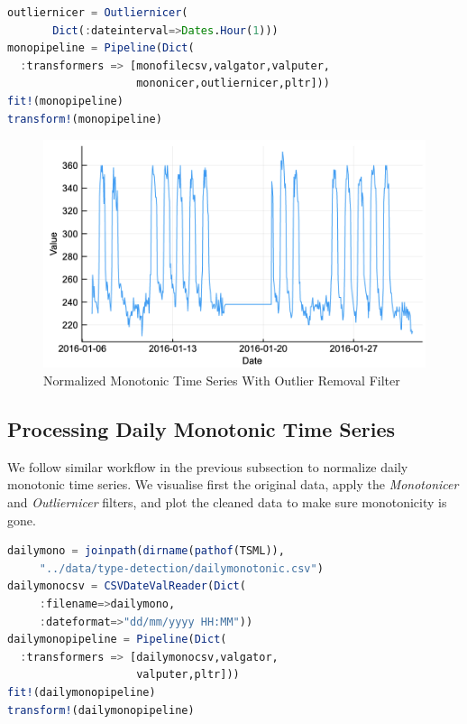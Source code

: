 \documentclass{juliacon}
\begin{document}
\begin{lstlisting}[language = Julia]
outliernicer = Outliernicer(
       Dict(:dateinterval=>Dates.Hour(1)))
monopipeline = Pipeline(Dict(
  :transformers => [monofilecsv,valgator,valputer,
                    mononicer,outliernicer,pltr]))
fit!(monopipeline)
transform!(monopipeline)
\end{lstlisting}

\begin{figure}[htbp]
   \centering
   \includegraphics[width=\columnwidth]{outnicer.png} %
   \caption{Normalized Monotonic Time Series With Outlier Removal Filter}
   \label{fig:outnicer}
\end{figure}

\subsection{Processing Daily Monotonic Time Series}
We follow similar workflow in the previous subsection to normalize daily monotonic time series. We visualise first the original data, apply the \emph{Monotonicer} and \emph{Outliernicer} filters, and plot the cleaned data to make sure monotonicity is gone.

\begin{lstlisting}[language = Julia]
dailymono = joinpath(dirname(pathof(TSML)),
     "../data/type-detection/dailymonotonic.csv")
dailymonocsv = CSVDateValReader(Dict(
     :filename=>dailymono,
     :dateformat=>"dd/mm/yyyy HH:MM"))
dailymonopipeline = Pipeline(Dict(
  :transformers => [dailymonocsv,valgator,
                    valputer,pltr]))
fit!(dailymonopipeline)
transform!(dailymonopipeline)
\end{lstlisting}
\end{document}
